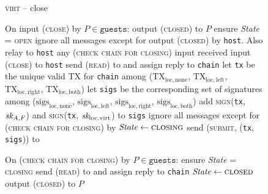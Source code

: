 \begin{figure}[H]
  \begin{processbox}{\textsc{virt} -- close}
    \begin{algorithmic}[1]
      \State On input (\textsc{close}) by $P \in \texttt{guests}$:
      \Indent
          \State output (\textsc{closed}) to $P$
        \EndIf
        \State ensure \textit{State} = \textsc{open}
         
          \State ignore all messages except for output (\textsc{closed}) by
          \texttt{host}. Also relay to \texttt{host} any (\textsc{check chain
          for closing}) input received
          \State input (\textsc{close}) to \texttt{host}
        \EndIf
        \State {}
        \State send (\textsc{read}) to \ledger and assign reply to
        \texttt{chain}
        \State let \texttt{tx} be the unique valid TX for \texttt{chain} among
        ($\mathrm{TX}_{\mathrm{loc}, \mathrm{none}}$,
        $\mathrm{TX}_{\mathrm{loc}, \mathrm{left}}$, $\mathrm{TX}_{\mathrm{loc},
        \mathrm{right}}$, $\mathrm{TX}_{\mathrm{loc}, \mathrm{both}}$)
        \State let \texttt{sigs} be the corresponding set of signatures among
        ($\mathrm{sigs}_{\mathrm{loc}, \mathrm{none}}$,
        $\mathrm{sigs}_{\mathrm{loc}, \mathrm{left}}$,
        $\mathrm{sigs}_{\mathrm{loc}, \mathrm{right}}$,
        $\mathrm{sigs}_{\mathrm{loc}, \mathrm{both}}$)
        \State add \textsc{sign}(\texttt{tx}, $\textit{sk}_{A, F}$) and
        \textsc{sign}(\texttt{tx}, $\textit{sk}_{\mathrm{loc}, \mathrm{virt}}$) to
        \texttt{sigs} 
        \State ignore all messages except for (\textsc{check chain for closing})
        by \environment
        \State $\textit{State} \gets \textsc{closing}$
        \State send (\textsc{submit}, (\texttt{tx}, \texttt{sigs})) to \ledger
      \EndIndent
      \Statex

      \State On (\textsc{check chain for closing}) by $P \in \texttt{guests}$:
      \Indent
        \State ensure \textit{State} = \textsc{closing}
        \State send (\textsc{read}) to \ledger and assign reply to
        \texttt{chain}
          \State $\textit{State} \gets \textsc{closed}$
          \State output (\textsc{closed}) to $P$
        \EndIf
      \EndIndent
    \end{algorithmic}
  \end{processbox}
  \caption{}
  \label{code:virtual-layer:close}
\end{figure}
